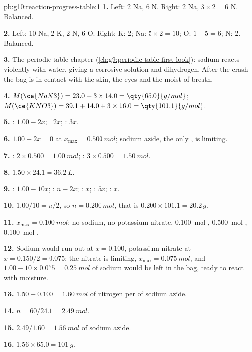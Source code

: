 \begin{solution}{pb:g10:reaction-progress-table:1}
\textbf{1.} Left: 2 Na, 6 N. Right: 2 Na, $3 \times 2 = 6$ N. Balanced.

\textbf{2.} Left: 10 Na, 2 K, 2 N, 6 O. Right: K: 2; Na: $5 \times 2 =
10$; O: $1 + 5 = 6$; N: 2. Balanced.

\textbf{3.} The periodic-table chapter (\cref{ch:g9:periodic-table-first-look}):
sodium reacts violently with water, giving a corrosive solution and
dihydrogen. After the crash the bag is in contact with the skin, the
eyes and the moist  of breath.

\textbf{4.} $M(\ce{NaN3}) = 23.0 + 3 \times 14.0 = \qty{65.0}{g/mol}$;
$M(\ce{KNO3}) = 39.1 + 14.0 + 3 \times 16.0 = \qty{101.1}{g/mol}$.

\textbf{5.} : $1.00 - 2x$; : $2x$; : $3x$.

\textbf{6.} $1.00 - 2x = 0$ at $x_{\max} = \qty{0.500}{mol}$; sodium
azide, the only , is limiting.

\textbf{7.} : $2 \times 0.500 = \qty{1.00}{mol}$; :
$3 \times 0.500 = \qty{1.50}{mol}$.

\textbf{8.} $1.50 \times 24.1 = \qty{36.2}{L}$.

\textbf{9.} : $1.00 - 10x$; : $n - 2x$; : $x$;
: $5x$; : $x$.

\textbf{10.} $1.00/10 = n/2$, so $n = \qty{0.200}{mol}$, that is
$0.200 \times 101.1 = \qty{20.2}{g}$.

\textbf{11.} $x_{\max} = \qty{0.100}{mol}$: no sodium, no potassium
nitrate, \qty{0.100}{mol} , \qty{0.500}{mol} ,
\qty{0.100}{mol} .

\textbf{12.} Sodium would run out at $x = 0.100$, potassium nitrate at
$x = 0.150/2 = 0.075$: the nitrate is limiting, $x_{\max} =
\qty{0.075}{mol}$, and $1.00 - 10 \times 0.075 = \qty{0.25}{mol}$ of
sodium  would be left in the bag, ready to react with moisture.

\textbf{13.} $1.50 + 0.100 = \qty{1.60}{mol}$ of nitrogen per  of
sodium azide.

\textbf{14.} $n = 60 / 24.1 = \qty{2.49}{mol}$.

\textbf{15.} $2.49 / 1.60 = \qty{1.56}{mol}$ of sodium azide.

\textbf{16.} $1.56 \times 65.0 = \qty{101}{g}$.


\end{solution}
